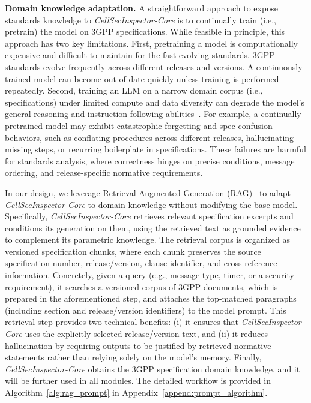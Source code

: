 \documentclass[sigconf]{acmart}
\newcommand{\core}{\textit{CellSecInspector-Core}\xspace}
\begin{document}
{\noindent \textbf{Domain knowledge adaptation.} A straightforward approach to expose standards knowledge to \core is to continually train (i.e., pretrain) the model on 3GPP specifications. While feasible in principle, this approach has two key limitations. 
First, pretraining a model is computationally expensive and difficult to maintain for the fast-evolving standards. 3GPP standards evolve frequently across different releases and versions. A continuously trained model can become out-of-date quickly unless training is performed repeatedly. Second, training an LLM on a narrow domain corpus (i.e., specifications) under limited compute and data diversity can degrade the model's general reasoning and instruction-following abilities~\cite{gururangan2020don, kemker2018measuring, ouyang2022training}. For example, a continually pretrained model may exhibit catastrophic forgetting and spec-confusion behaviors, such as conflating procedures across different releases, hallucinating missing steps, or recurring boilerplate in specifications. These failures are harmful for standards analysis, where correctness hinges on precise conditions, message ordering, and release-specific normative requirements.

In our design, we leverage Retrieval-Augmented Generation (RAG)~\cite{lewis2020retrieval} to adapt \core to domain knowledge without modifying the base model. Specifically, \textit{CellSec\-Inspector-Core} retrieves relevant specification excerpts and conditions its generation on them, using the retrieved text as grounded evidence to complement its parametric knowledge. 
The retrieval corpus is organized as versioned specification chunks, where each chunk preserves the source specification number, release/version, clause identifier, and cross-reference information.
Concretely, given a query (e.g., message type, timer, or a security requirement), it searches a versioned corpus of 3GPP documents, which is prepared in the aforementioned step, and attaches the top-matched paragraphs (including section and release/version identifiers) to the model prompt. This retrieval step provides two technical benefits: (i) it ensures that \core uses the explicitly selected release/version text, and (ii) it reduces hallucination by requiring outputs to be justified by retrieved normative statements rather than relying solely on the model’s memory. Finally, \core obtains the 3GPP specification domain knowledge, and it will be further used in all modules. The detailed workflow is provided in Algorithm~\ref{alg:rag_prompt} in Appendix~\ref{append:prompt_algorithm}.


}
\end{document}
